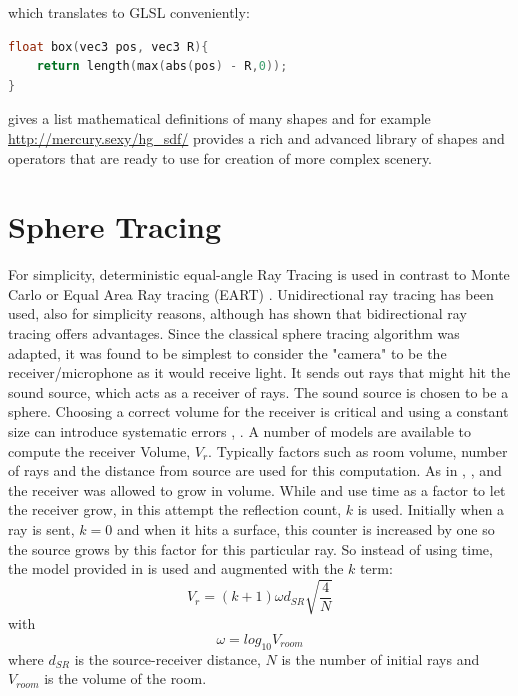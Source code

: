 \documentclass[twoside,a4paper]{article}
\begin{document}
which translates to GLSL conveniently:

\begin{lstlisting}[language=C, caption={\it GLSL code for creating a box SDF},captionpos=b, label=lst:boxSdf]
float box(vec3 pos, vec3 R){
    return length(max(abs(pos) - R,0));
}
\end{lstlisting}

\cite{hart_sphere_1996} gives a list mathematical definitions of many shapes and for example \href{http://mercury.sexy/hg_sdf/}{http://mercury.sexy/hg\_sdf/} provides a rich and advanced library of shapes and operators that are ready to use for creation of more complex scenery.


\section{Sphere Tracing}
For simplicity, deterministic equal-angle Ray Tracing is used in contrast to Monte Carlo or Equal Area Ray tracing (EART) \cite{gu_room_2014}. Unidirectional ray tracing has been used, also for simplicity reasons, although \cite{cao_interactive_2016} has shown that bidirectional ray tracing offers advantages. Since the classical sphere tracing algorithm was adapted, it was found to be simplest to consider the "camera" to be the receiver/microphone as it would receive light. It sends out rays that might hit the sound source, which acts as a receiver of rays. The sound source is chosen to be a sphere. Choosing a correct volume for the receiver is critical and using a constant size can introduce systematic errors \cite{xiangyang_accuracy_2003}, \cite{alpkocak_computing_2010}. A number of models are available to compute the receiver Volume, $V_r$. Typically factors such as room volume, number of rays and the distance from source are used for this computation. 
As in \cite{brandao_ray_nodate}, \cite{alpkocak_computing_2010}, and \cite{dalenback_room_1996} the receiver was allowed to grow in volume. While \cite{brandao_ray_nodate} and \cite{dalenback_room_1996} use time as a factor to let the receiver grow, in this attempt the reflection count, $k$ is used. Initially when a ray is sent, $k=0$ and when it hits a surface, this counter is increased by one so the source grows by this factor for this particular ray. So instead of using time, the model provided in \cite{alpkocak_computing_2010} is used and augmented with the $k$ term:
\begin{equation}
V_r = (k+1) \omega d_{SR}\sqrt{\frac{4}{N}}
\end{equation}
with 
\begin{equation}
\omega = log_{10}{V_{room}}
\end{equation}
where $d_{SR}$ is the source-receiver distance, $N$ is the number of initial rays and $V_{room}$ is the volume of the room.\
\end{document}
